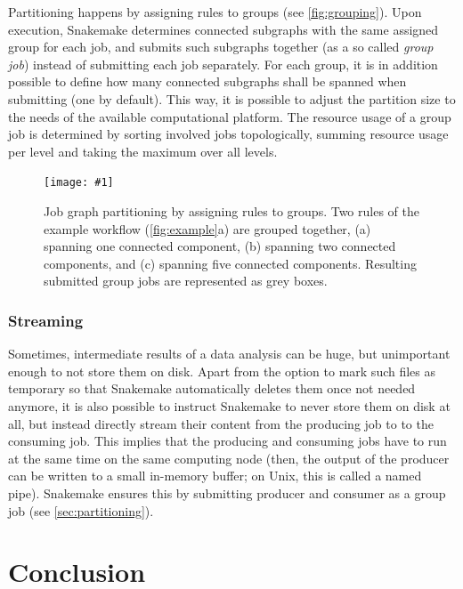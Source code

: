 \documentclass[parskip=half]{scrartcl}
\newcommand{\image}[1]{\centering\texttt{[image: \#1]}}
\begin{document}
Partitioning happens by assigning rules to groups (see \autoref{fig:grouping}).
Upon execution, Snakemake determines connected subgraphs with the same assigned group for each job, and submits such subgraphs together (as a so called \emph{group job}) instead of submitting each job separately.
For each group, it is in addition possible to define how many connected subgraphs shall be spanned when submitting (one by default).
This way, it is possible to adjust the partition size to the needs of the available computational platform.
The resource usage of a group job is determined by sorting involved jobs topologically, summing resource usage per level and taking the maximum over all levels.

\begin{figure}
	\image{group-jobs.pdf}
	\caption{Job graph partitioning by assigning rules to groups.
		Two rules of the example workflow (\autoref{fig:example}a) are grouped together, (a) spanning one connected component, (b) spanning two connected components, and (c) spanning five connected components.
		Resulting submitted group jobs are represented as grey boxes.
	}\label{fig:grouping}
\end{figure}

\subsubsection{Streaming}\label{sec:streaming}

Sometimes, intermediate results of a data analysis can be huge, but unimportant enough to not store them on disk.
Apart from the option to mark such files as temporary so that Snakemake automatically deletes them once not needed anymore, it is also possible to instruct Snakemake to never store them on disk at all, but instead directly stream their content from the producing job to to the consuming job.
This implies that the producing and consuming jobs have to run at the same time on the same computing node (then, the output of the producer can be written to a small in-memory buffer; on Unix, this is called a named pipe).
Snakemake ensures this by submitting producer and consumer as a group job (see \autoref{sec:partitioning}).

\section{Conclusion}
\end{document}
